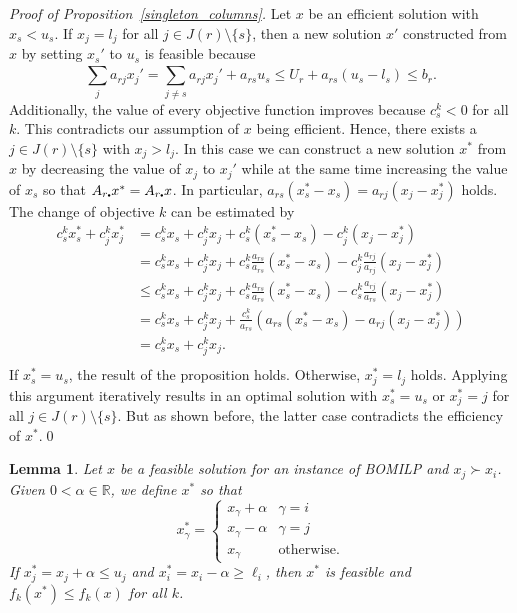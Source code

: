\documentclass[11.5pt]{article}
\newtheorem{lemma}{Lemma}
\newcommand{\su}[2][1]{\ensuremath{\displaystyle{\sum_{#1}^{#2}}}}
\newcommand{\R}{\mathbb{R}}
\newcommand{\dom}{\succ}
\newcommand{\bul}{\scalebox{.45}{\ensuremath{\bullet}}}
\begin{document}
\begin{proof}[Proof of Proposition~\ref{singleton_columns}]
\renewcommand{\ell}{l}
Let $x$ be an efficient solution with $x_s  < u_s$. If $x_j = \ell_j$ for all $j\in J (r )\setminus\{s\}$,
then a new solution $x'$ constructed from $x$ by setting $x_s'$ to $u_s$ is feasible because
\[\su[j]{}a_{rj}x_j'=\su[j\neq s]{}a_{rj}x_j' + a_{rs}u_s \leq U_r + a_{rs}(u_s-\ell_s) \leq b_r.\]
Additionally, the value of every objective function improves because $c_s^k < 0$ for all $k$. This contradicts
our assumption of $x$ being efficient. Hence, there exists a $j \in J (r )\setminus\{s\}$ with $x_j > \ell_j$. In this case we can construct a new solution ${x}^*$ from $x$ by decreasing the value of $x_j$
to $x_j'$ while at the same time increasing the value of $x_s$ so that $A_{r \bul} {x}^* = A_{r\bul} x$. In particular, $a_{r s} ({x}_s^* - x_s) = a_{r j} (x_j - {x}_j^* )$ holds. The change of objective $k$ can be estimated by
\begin{align*}
c_s^k {x}_s^* + c^k_j {x}_j^* &= c^k_s x_s + c^k_j x_j + c^k_s ({x}_s^* - x_s) - c^k_j (x_j - {x}_j^* )\\
&= c^k_s x_s + c^k_j x_j + c^k_s \frac{a_{rs}}{a_{rs}} ({x}_s^* - x_s) - c^k_j \frac{a_{rj}}{a_{rj}} (x_j - {x}_j^* )\\
&\leq c^k_s x_s + c^k_j x_j + c^k_s \frac{a_{rs}}{a_{rs}} ({x}_s^* - x_s) - c^k_s \frac{a_{rj}}{a_{rs}} (x_j - {x}_j^* )\\
&= c^k_s x_s + c^k_j x_j + \frac{ c^k_s}{a_{rs}}\left( a_{rs}({x}_s^* - x_s) - a_{rj} (x_j - {x}_j^* )\right)\\
&= c^k_s x_s + c^k_j x_j.\\
\end{align*}
If ${x}_s^* = u_s$, the result of the proposition holds. Otherwise, ${x}_j^* = \ell_j$ holds. Applying this argument iteratively results in an optimal solution with ${x}_s^* = u_s$ or ${x}_j^* = j$ for all $j \in J (r )\setminus\{s\}$. But as shown before, the latter case contradicts the efficiency of $x^*$.\qed
\end{proof}

\begin{lemma}\label{lemma1}
Let $x$ be a feasible solution for an instance of BOMILP and $x_j \dom x_i$. Given $0 < \alpha \in \R$, we define $x^*$ so that 
\[x^*_\gamma = \left\{\begin{array}{cc}
x_\gamma + \alpha & \gamma = i\\
x_\gamma - \alpha & \gamma = j\\
x_\gamma & \text{otherwise.}
\end{array} \right. \] 
If $x^*_j = x_j + \alpha \leq u_j$ and $x^*_i = x_i - \alpha \geq \ell_i$, then $x^*$ is feasible and $f_k( x^*) \leq f_k(x)$ for all $k$.
\end{lemma}
\end{document}
